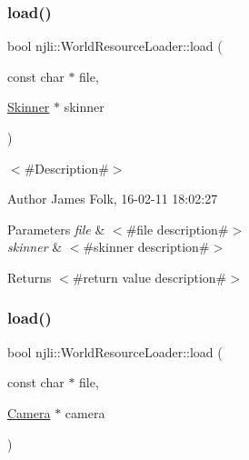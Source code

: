 \subsubsection{\texorpdfstring{load()}{load()}\hspace{0.1cm}{\footnotesize\ttfamily [11/13]}}
{\footnotesize\ttfamily bool njli\+::\+World\+Resource\+Loader\+::load (\begin{DoxyParamCaption}\item[{const char $\ast$}]{file,  }\item[{\mbox{\hyperlink{classnjli_1_1_skinner}{Skinner}} $\ast$}]{skinner }\end{DoxyParamCaption})}



$<$\#\+Description\#$>$ 

\begin{DoxyAuthor}{Author}
James Folk, 16-\/02-\/11 18\+:02\+:27
\end{DoxyAuthor}

\begin{DoxyParams}{Parameters}
{\em file} & $<$\#file description\#$>$ \\
\hline
{\em skinner} & $<$\#skinner description\#$>$\\
\hline
\end{DoxyParams}
\begin{DoxyReturn}{Returns}
$<$\#return value description\#$>$ 
\end{DoxyReturn}
\mbox{\label{classnjli_1_1_world_resource_loader_a46e21edb3dd2513f4fb06c2ccce908e5}} 
\subsubsection{\texorpdfstring{load()}{load()}\hspace{0.1cm}{\footnotesize\ttfamily [12/13]}}
{\footnotesize\ttfamily bool njli\+::\+World\+Resource\+Loader\+::load (\begin{DoxyParamCaption}\item[{const char $\ast$}]{file,  }\item[{\mbox{\hyperlink{classnjli_1_1_camera}{Camera}} $\ast$}]{camera }\end{DoxyParamCaption})}



